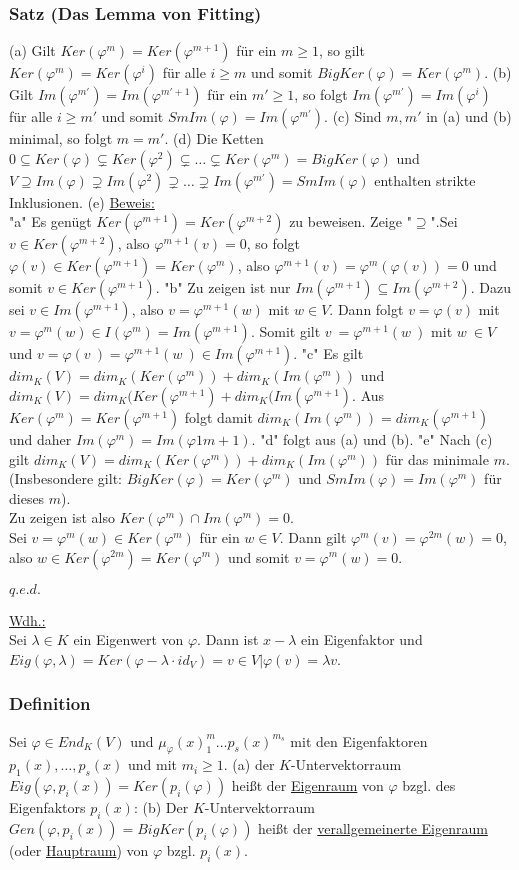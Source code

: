 \documentclass[a4paper]{article}
\newcommand{\ul}{\underline}
\renewcommand{\qed}{\begin{flushright}
\ul{\(q.e.d.\)}
\end{flushright}}
\let\phi\varphi
\begin{document}
\subsubsection{Satz (Das Lemma von Fitting)}
(a) Gilt \(Ker(\phi^m)=Ker(\phi^{m+1})\) für ein \(m \geq 1\), so gilt \(Ker(\phi^m)=Ker(\phi^i)\) für alle \(i \geq m\) und somit \(BigKer(\phi)=Ker(\phi^m)\).
(b) Gilt \(Im(\phi^{m'})=Im(\phi^{m'+1})\) für ein \(m' \geq 1\), so folgt \(Im(\phi^{m'})=Im(\phi^i)\) für alle \(i \geq m'\) und somit \(SmIm(\phi)=Im(\phi^{m'})\).
(c) Sind \(m,m'\) in (a) und (b) minimal, so folgt \(m=m'\).
(d) Die Ketten \({0} \subseteq Ker(\phi) \subsetneq Ker(\phi^2) \subsetneq \dots \subsetneq Ker(\phi^m)=BigKer(\phi)\) und \(V \supseteq Im(\phi) \supsetneq Im(\phi^2) \supsetneq \dots \supsetneq Im(\phi^{m'}) = SmIm(\phi)\) enthalten strikte Inklusionen.
(e) \fbox{\(V=BigKer(\phi) \oplus SmIm(\phi)\)}
\ul{Beweis:}\\
"a" Es genügt \(Ker(\phi^{m+1}) =Ker(\phi^{m+2})\) zu beweisen. Zeige "\(\supseteq\)".Sei \(v \in Ker(\phi^{m+2})\), also \(\phi^{m+1}(v)=0\), so folgt \(\phi(v)\in Ker(\phi^{m+1})=Ker(\phi^m)\), also \(\phi^{m+1}(v)= \phi^m(\phi(v))=0\) und somit \(v \in Ker(\phi^{m+1})\).
"b" Zu zeigen ist nur \(Im(\phi^{m+1}) \subseteq Im(\phi^{m+2})\). Dazu sei \(v\in Im(\phi^{m+1})\), also \(v=\phi^{m+1}(w)\) mit \(w\in V\). Dann folgt \(v=\phi(\overset{~}{v})\) mit \(\overset{~}{v} = \phi^m(w)\in I(\phi^m)=Im(\phi^{m+1})\). Somit gilt \(v~ = \phi^{m+1}(w~)\) mit \(w~ \in V\) und \(v=\phi(v~)=\phi^{m+1}(w~)\in Im(\phi^{m+1})\).
"c" Es gilt \(dim_K(V)=dim_K(Ker(\phi^m))+dim_K(Im(\phi^m))\) und \(dim_K(V)=dim_K(Ker(\phi^{m+1})+dim_K(Im(\phi^{m+1})\).
Aus \(Ker(\phi^m)=Ker(\phi^{m+1})\) folgt damit \(dim_K(Im(\phi^m))=dim_K(\phi^{m+1})\) und daher \(Im(\phi^m)=Im(\phi1{m+1})\).
"d" folgt aus (a) und (b).
"e" Nach (c) gilt \(dim_K(V)=dim_K(Ker(\phi^m))+dim_K(Im(\phi^m))\) für das minimale \(m\). (Insbesondere gilt: \(BigKer(\phi)=Ker(\phi^m)\) und \(SmIm(\phi)=Im(\phi^m)\) für dieses \(m\)).\\
Zu zeigen ist also \(Ker(\phi^m) \cap Im(\phi^m)={0}\).\\
Sei \(v = \phi^m(w)\in Ker(\phi^m)\) für ein \(w\in V\). Dann gilt \(\phi^m(v)=\phi^{2m}(w)=0\), also \(w\in Ker(\phi^{2m})=Ker(\phi^m)\) und somit \(v=\phi^m(w)=0\).
\qed
\ul{Wdh.:}\\
Sei \(\lambda\in K\) ein Eigenwert von \(\phi\). Dann ist \(x-\lambda\) ein Eigenfaktor und \(Eig(\phi, \lambda)=Ker(\phi-\lambda\cdot id_V)={v\in V | \phi(v)=\lambda v}\).
\subsubsection{Definition}
Sei \(\phi\in End_K(V)\) und \(\mu_\phi(x)^m_1\dots p_s(x)^{m_s}\) mit den Eigenfaktoren \(p_1(x),\dots,p_s(x)\) und mit \(m_i\geq 1\).
(a) der \(K\)-Untervektorraum \(Eig(\phi, p_i(x)) = Ker(p_i(\phi))\) heißt der \ul{Eigenraum} von \(\phi\) bzgl. des Eigenfaktors \(p_i(x)\):
(b) Der \(K\)-Untervektorraum \(Gen(\phi, p_i(x))=BigKer(p_i(\phi))\) heißt der \ul{verallgemeinerte  Eigenraum} (oder \ul{Hauptraum}) von \(\phi\) bzgl. \(p_i(x)\).
\end{document}
